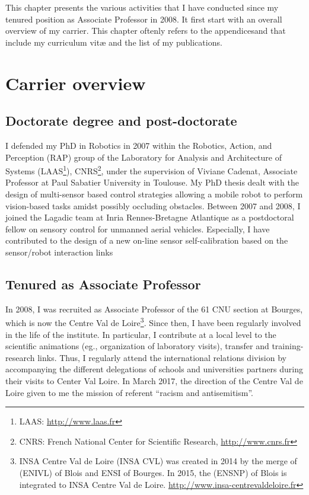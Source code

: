 

This chapter presents the various activities that I have conducted since my tenured position as  Associate Professor in 2008. It first start with an overall overview of my carrier.
This chapter oftenly refers to the appendices\;\RefAnnexeCV and \RefAnnexeRef that include my curriculum vit\ae{} and the list of my publications.

\section{Carrier overview}

\subsection{Doctorate degree and post-doctorate}
I defended my PhD in Robotics in 2007 within the  Robotics, Action, and Perception (RAP) group of the Laboratory for Analysis and Architecture of Systems (LAAS\footnote{LAAS: \url{http://www.laas.fr}}), CNRS\footnote{CNRS:  French National Center for Scientific Research, \url{http://www.cnrs.fr}}, under the supervision of Viviane Cadenat, Associate Professor at Paul Sabatier University in Toulouse. 
My PhD thesis dealt with the design of multi-sensor based control strategies allowing a mobile robot to perform vision-based tasks amidst possibly occluding obstacles.
Between 2007 and 2008, I joined the Lagadic team at Inria Rennes-Bretagne Atlantique as a postdoctoral fellow on sensory control for unmanned aerial vehicles. 
Especially, I have contributed to the design of a new on-line sensor self-calibration based on the sensor/robot interaction links \citep{2010_icra_kermorgant}%

\subsection{Tenured as Associate Professor}
In 2008, I was recruited as Associate Professor of the 61 CNU section at \ENSI Bourges, which is now  the \INSA Centre Val de Loire\footnote{INSA Centre Val de Loire (INSA CVL) was created in 2014 by the merge of  (ENIVL) of Blois and ENSI of Bourges. In 2015, the  (ENSNP) of Blois is integrated to INSA Centre Val de Loire. \url{http://www.insa-centrevaldeloire.fr}}. 
Since then, I have been regularly involved in the life of the institute. 
In particular, I contribute at a local level to the scientific animations (eg., organization of laboratory visits), transfer and training-research links. 
Thus, I regularly attend the international relations division by accompanying the different delegations of schools and  universities partners during their visits to \INSA Center Val Loire.
In March 2017, the direction of the \INSA Centre Val de Loire  given to me the mission of referent \enquote{racism and antisemitism}.

